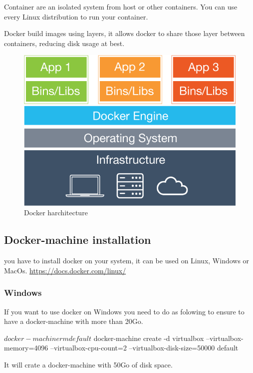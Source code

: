 \documentclass[a4paper,11pt]{report}
\begin{document}
Container are an isolated system from host or other containers. You can use every Linux distribution to run your container.

Docker build images using layers, it allows docker to share those layer between containers, reducing disk usage at best.

\begin{figure}
	\begin{center}
		\includegraphics[scale=0.35]{img/what-is-vm-diagram}
		\caption{Docker harchitecture}
	\end{center}
\end{figure}

\subsection{Docker-machine installation}
you have to install docker on your system, it can be used on Linux, Windows or MacOs. \url{https://docs.docker.com/linux/}

\subsubsection{Windows}
If you want to use docker on Windows you need to do as folowing to ensure to have a docker-machine with more than 20Go.

\begin{javacode}
$ docker-machine rm default
$ docker-machine create -d virtualbox --virtualbox-memory=4096 --virtualbox-cpu-count=2 --virtualbox-disk-size=50000 default
\end{javacode}

It will crate a docker-machine with 50Go of disk space.
\end{document}
